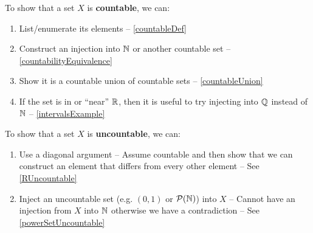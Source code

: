 \documentclass[../main.tex]{subfiles}
\begin{document}
\begin{remark}[Summary]\par
To show that a set $X$ is \textbf{countable}, we can:
\begin{enumerate}
  \item List/enumerate its elements -- \cref{countableDef}
  \item Construct an injection into $\mathbb{N}$ or another countable set -- \cref{countabilityEquivalence}
  \item Show it is a countable union of countable sets -- \cref{countableUnion}
  \item If the set is in or ``near'' $\mathbb{R}$, then it is useful to try injecting into $\mathbb{Q}$ instead of $\mathbb{N}$ -- \cref{intervalsExample}
\end{enumerate}
To show that a set $X$ is \textbf{uncountable}, we can:
\begin{enumerate}
  \item Use a diagonal argument -- Assume countable and then show that we can construct an element that differs from every other element -- See \cref{RUncountable}
  \item Inject an uncountable set (e.g. $(0, 1)$ or  $\mathcal{P}(\mathbb{N})$) into $X$ -- Cannot have an injection from $X$ into $\mathbb{N}$ otherwise we have a contradiction -- See \cref{powerSetUncountable}
\end{enumerate}
\end{remark}
\end{document}
